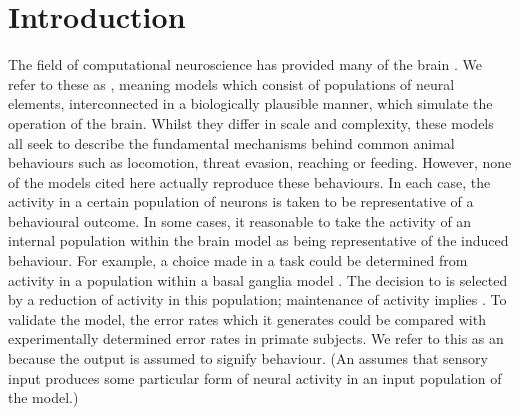 \documentclass{frontiersSCNS}
\begin{document}
\section{Introduction}


The field of computational neuroscience has provided
many  of the brain \citep{arai_two-dimensional_1994,gancarz_neural_1998,hazy_towards_2007,blenkinsop_frequency_2017}.
We refer to these as , meaning
models which consist of populations of neural elements, interconnected
in a biologically plausible manner, which simulate the operation of
the brain. Whilst they differ in scale and complexity, these models
all seek to
describe the fundamental mechanisms behind common animal behaviours
such as locomotion, threat evasion, reaching or feeding. However,
none of the models cited here actually reproduce these
behaviours. In each case, the activity in a certain population of
neurons is taken to be representative of a behavioural outcome.
In some cases, it  reasonable to take the activity of an internal
population within the brain model as being representative of the
induced behaviour. For example, a choice made in a  task
could be determined from activity in a population within a basal
ganglia model
\citep{nambu_discharge_1990,kuhn_event-related_2004}. The decision
to  is selected by a reduction of activity in this population;
maintenance of activity implies . To validate the model, the
error rates which it generates
could be compared with experimentally determined error rates in
primate subjects. We refer
to this as an  because the output is assumed
to signify behaviour. (An  assumes that sensory
input produces some particular form of neural activity in an input
population of the model.)
\end{document}
